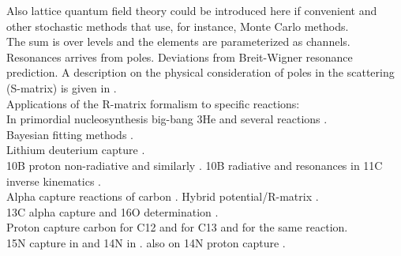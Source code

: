 \documentclass[openany]{book}
\begin{document}
Also lattice quantum field theory could be introduced here if convenient and other stochastic methods that use, for instance, Monte Carlo methods. \\

The sum is over levels and the elements are parameterized as channels.  \\

Resonances arrives from poles. Deviations from Breit-Wigner resonance prediction. A description on the physical consideration of poles in the scattering (S-matrix) is given in \cite{ramirezjimenez_kelkar_2018}. \\

Applications of the R-matrix formalism to specific reactions: \\

In primordial nucleosynthesis \cite{desouza_iliadis_coc_2019} big-bang 3He and several reactions \cite{sparta_pizzone_bertulani_hou_lamia_tumino_2020}. \\

Bayesian fitting methods \cite{odell_brune_phillips_2022}. \\

Lithium deuterium capture \cite{grineviciute_lamia_mukhamedzhanov_spitaleri_lacognata_2015}. \\

10B proton non-radiative \cite{kolk_macon_deboer_anderson_boeltzig_brandenburg_brune_chen_clark_danley_et_2022} and similarly \cite{sieverding_randhawa_zetterberg_deboer_ahn_mancino_martinez-pinedo_hix_2022}. 10B radiative and resonances in 11C inverse kinematics \cite{kaur_guimaraes_zamora_assuncao_alcantara-nunez_delara_zevallos_ribeiro_lichtenthaler_pires_et_2022}. \\

Alpha capture reactions of carbon \cite{schurmann_gialanella_kunz_strieder_2012}.  Hybrid potential/R-matrix \cite{sparenberg_2005}. \\

 13C alpha capture and 16O determination \cite{prusachenko_bobrovsky_bondarenko_bokhovko_gurbich_ketlerov_2022}. \\

Proton capture carbon \cite{burtebaev_igamov_peterson_yarmukhamedov_zazulin_2008} for C12 and \cite{chakraborty_deboer_mukherjee_roy_2015} for C13 and \cite{genard_descouvemont_terwagne_2010} for the same reaction. \\

15N capture in \cite{barker_2008} and 14N in \cite{angulo_champagne_trautvetter_2005}. also on 14N proton capture \cite{formicola_imbriani_costantini_angulo_bemmerer_bonetti_broggini_corvisiero_cruz_descouvemont_et_2004}. \\
\end{document}

